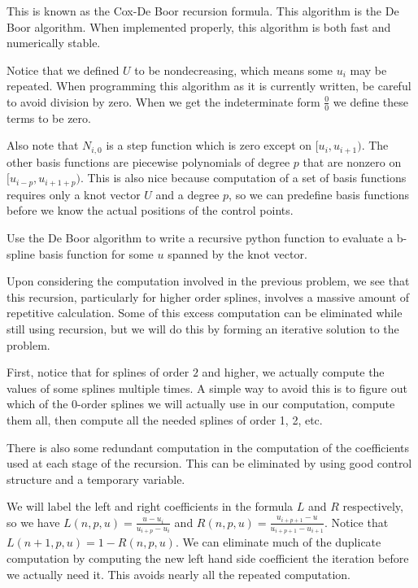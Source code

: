 This is known as the Cox-De Boor recursion formula.
This algorithm is the De Boor algorithm.
When implemented properly, this algorithm is both fast and numerically stable.

Notice that we defined $U$ to be nondecreasing, which means some $u_i$ may be repeated.
When programming this algorithm as it is currently written, be careful to avoid division by zero.
When we get the indeterminate form $\frac{0}{0}$ we define these terms to be zero.

Also note that $N_{i,0}$ is a step function which is zero except on $[u_i, u_{i+1})$.
The other basis functions are piecewise polynomials of degree $p$ that are nonzero on $[u_{i-p}, u_{i+1+p})$.
This is also nice because computation of a set of basis functions requires only a knot vector $U$ and a degree $p$, so we can predefine basis functions before we know the actual positions of the control points.

\begin{problem}
Use the De Boor algorithm to write a recursive python function to evaluate a b-spline basis function for some $u$ spanned by the knot vector.
\end{problem}

Upon considering the computation involved in the previous problem, we see that this recursion, particularly for higher order splines, involves a massive amount of repetitive calculation.
Some of this excess computation can be eliminated while still using recursion, but we will do this by forming an iterative solution to the problem.

First, notice that for splines of order $2$ and higher, we actually compute the values of some splines multiple times.
A simple way to avoid this is to figure out which of the 0-order splines we will actually use in our computation, compute them all, then compute all the needed splines of order 1, 2, etc.

There is also some redundant computation in the computation of the coefficients used at each stage of the recursion.
This can be eliminated by using good control structure and a temporary variable.

We will label the left and right coefficients in the formula $L$ and $R$ respectively, so we have $L(n,p,u) = \frac{u - u_i}{u_{i+p} - u_i}$ and $R(n,p,u) = \frac{u_{i + p + 1} - u}{u_{i + p + 1} - u_{i + 1}}$.
Notice that $L(n+1,p,u) = 1 - R(n,p,u)$.
We can eliminate much of the duplicate computation by computing the new left hand side coefficient the iteration before we actually need it.
This avoids nearly all the repeated computation.


